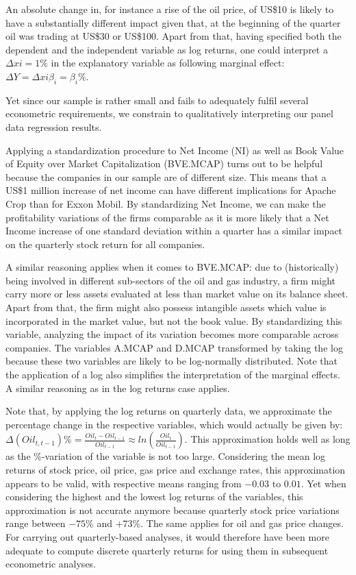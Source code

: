 \documentclass[a4paper]{article}
\begin{document}
An absolute change in, for instance a rise of the oil price, of US\$10 is likely to have a substantially different impact given that, at the beginning of the quarter oil was trading at US\$30 or US\$100. Apart from that, having specified both the dependent and the independent variable as log returns, one could interpret a $\Delta xi = 1 \%$ in the explanatory variable as following marginal effect: $\Delta Y=\Delta xi \beta_i = \beta_i\%$.

Yet since our sample is rather small and fails to adequately fulfil several econometric requirements, we constrain to qualitatively interpreting our panel data regression results. 

Applying a standardization procedure to Net Income (NI) as well as Book Value of Equity over Market Capitalization (BVE.MCAP) turns out to be helpful because the companies in our sample are of different size. This means that a US\$1 million increase of net income can have different implications for Apache Crop than for Exxon Mobil. By standardizing Net Income, we can make the profitability variations of the firms comparable as it is more likely that a Net Income increase of one standard deviation within a quarter has a similar impact on the quarterly stock return for all companies. 

A similar reasoning applies when it comes to BVE.MCAP: due to (historically) being involved in different sub-sectors of the oil and gas industry, a firm might carry more or less assets evaluated at less than market value on its balance sheet. Apart from that, the firm might also possess intangible assets which value is incorporated in the market value, but not the book value. By standardizing this variable, analyzing the impact of its variation becomes more comparable across companies. 
The variables A.MCAP and D.MCAP transformed by taking the log because these two variables are likely to be log-normally distributed. Note that the application of a log also simplifies the interpretation of the marginal effects. A similar reasoning as in the log returns case applies. 

Note that, by applying the log returns on quarterly data, we approximate the percentage change in the respective variables, which would actually be given by: $\Delta(Oil_{t,t-1})\% = \frac{Oil_t - Oil_{t-1}}{Oil_{t-1}} \approx ln (\frac{Oil_t}{Oil_{t-1}})$. This approximation holds well as long as the \%-variation of the variable is not too large. Considering the mean log returns of stock price, oil price, gas price and exchange rates, this approximation appears to be valid, with respective means ranging from $-0.03$ to $0.01$. Yet when considering the highest and the lowest log returns of the variables, this approximation is not accurate anymore because quarterly stock price variations range between $-75\%$ and $+73\%$. The same applies for oil and gas price changes. For carrying out quarterly-based analyses, it would therefore have been more adequate to compute discrete quarterly returns for using them in subsequent econometric analyses. 
\end{document}
